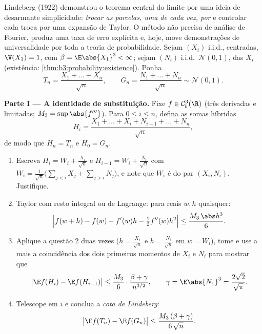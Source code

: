 \begin{problem}
\label{pb:b3:clt:1}
Lindeberg (1922) demonstrou o teorema central do limite por uma ideia de
desarmante simplicidade: \emph{trocar as parcelas, uma de cada vez, por
} e controlar cada troca por uma expansão de Taylor. O método
não precisa de análise de Fourier, produz uma taxa de erro explícita e,
hoje, move demonstrações de universalidade por toda a teoria de
probabilidade. Sejam $(X_i)$ i.i.d., centradas, $\V(X_1) = 1$, com $\beta = \E\abs{X_1}^3 < \infty$;
sejam $(N_i)$ i.i.d.\ $\mathcal N(0,1)$,  das $X_i$
(existência: \cref{thm:b3:probability:existence}). Ponha
\[
T_n = \frac{X_1 + \dots + X_n}{\sqrt n},
\qquad
G_n = \frac{N_1 + \dots + N_n}{\sqrt n} \sim \mathcal N(0,1).
\]

\medskip
\noindent\textbf{Parte I --- A identidade de substituição.} Fixe $f
\in \mathcal C^3_b(\R)$
(três derivadas  e limitadas; $M_3 = \sup\abs{f'''}$). Para $0 \leq i \leq n$, defina as
somas híbridas
\[
H_i = \frac{X_1 + \dots + X_i + N_{i+1} + \dots +
N_n}{\sqrt n},
\]
de modo que $H_n = T_n$ e $H_0 = G_n$.
\begin{enumerate}
  \item Escreva $H_i = W_i + \frac{X_i}{\sqrt n}$ e $H_{i-1}
        = W_i + \frac{N_i}{\sqrt n}$ com $W_i =
        \frac{1}{\sqrt n}\bigl(\sum_{j<i}X_j +
        \sum_{j>i}N_j\bigr)$, e note que $W_i$ é
         do par $(X_i, N_i)$. Justifique.
  \item Taylor com resto integral ou de Lagrange: para reais $w, h$
        quaisquer:
        \[
        \Bigl|f(w + h) - f(w) - f'(w)h -
        \tfrac12f''(w)h^2\Bigr| \leq
        \frac{M_3\,\abs h^3}{6} .
        \]
  \item Aplique a questão 2 duas vezes ($h = \frac{X_i}{\sqrt n}$ e $h = \frac{N_i}{\sqrt n}$ em $w = W_i$), tome
         e use a  mais a coincidência dos dois
        primeiros momentos de $X_i$ e $N_i$ para mostrar que
        \[
        \bigl|\E f(H_i) - \E f(H_{i-1})\bigr|
        \leq \frac{M_3}{6}\cdot
        \frac{\beta + \gamma}{n^{3/2}},
        \qquad \gamma = \E\abs{N_1}^3 =
        \frac{2\sqrt2}{\sqrt\pi} .
        \]
  \item Telescope em $i$ e conclua a \emph{cota de Lindeberg}:
        \[
        \bigl|\E f(T_n) - \E f(G_n)\bigr| \leq
        \frac{M_3\,(\beta + \gamma)}{6\,\sqrt n} .
        \]
\end{enumerate}


\end{problem}
